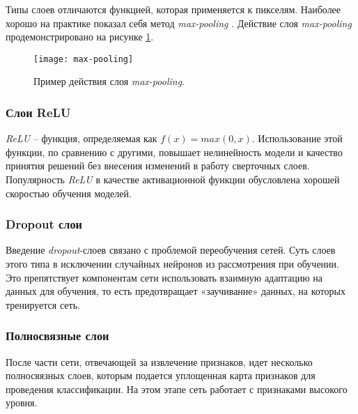 Типы слоев отличаются функцией, которая применяется к пикселям. Наиболее хорошо на практике показал себя метод \emph{max-pooling} \cite{cnn-max-pooling}. Действие слоя \emph{max-pooling} продемонстрировано на рисунке \ref{fig:max-pooling}.
\begin{figure}[h]
	\centering
	\texttt{[image: max-pooling]}
	\caption{Пример действия слоя \emph{max-pooling}.}
	\label{fig:max-pooling}
\end{figure}

\subsubsection{Слои ReLU}
\emph{ReLU} – функция, определяемая как $f(x)=max(0, x)$. Использование этой функции, по сравнению с другими, повышает нелинейность модели и качество принятия решений без внесения изменений в работу сверточных слоев\cite[с.~3]{cnn-imagenet}. Популярность \emph{ReLU} в качестве активационной функции обусловлена хорошей скоростью обучения моделей.

\subsubsection{Dropout слои}
Введение \emph{dropout}-слоев связано с проблемой переобучения сетей\cite{dnn-dropout}. Суть слоев этого типа в исключении случайных нейронов из рассмотрения при обучении. Это препятствует компонентам сети использовать взаимную адаптацию на данных для обучения, то есть предотвращает «заучивание» данных, на которых тренируется сеть.

\subsubsection{Полносвязные слои}
После части сети, отвечающей за извлечение признаков, идет несколько полносвязных слоев, которым подается уплощенная карта признаков для проведения классификации. На этом этапе сеть работает с признаками высокого уровня.
